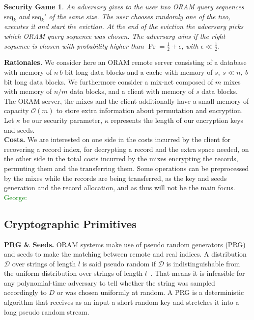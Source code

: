 \documentclass[USenglish,oneside,twocolumn]{article}
\newtheorem*{secgme}{Security Game}
\newcommand{\george}[1]{\textcolor{green}{George: #1}}
\begin{document}
%
\begin{secgme}
An adversary gives to the user two ORAM query sequences $\text{seq}_k$ and $\text{seq}_k'$ of the same size. The user chooses randomly one of the two, executes it and start the eviction. At the end of the eviction the adversary picks which ORAM query sequence was chosen. The adversary wins if the right sequence is chosen with probability higher than $\Pr = \frac{1}{2}+\epsilon$, with $\epsilon\ll\frac{1}{2}$.
\label{def:Game}
\end{secgme} 
%

\noindent\textbf{Rationales.} We consider here an ORAM remote server consisting of a database with memory of $n\ b$-bit long data blocks and a cache with memory of $s,\ s\ll n,\ b$-bit long data blocks. We furthermore consider a mix-net composed of $m$ mixes with memory of $n/m$ data blocks, and a client with memory of $s$ data blocks. The ORAM server, the mixes and the client additionally have a small memory of capacity $\mathcal{O}(m)$ to store extra information about permutation and encryption. Let $\kappa$ be our security parameter, $\kappa$ represents the length of our encryption keys and seeds.\\

\noindent\textbf{Costs.} We are interested on one side in the costs incurred by the client for recovering a record index, for decrypting a record and the extra space needed, on the other side in the total costs incurred by the mixes encrypting the records, permuting them and the transferring them.
Some operations can be preprocessed by the mixes while the records are being transferred, as the key and seeds generation and the record allocation, and as thus will not be the main focus. \george{} 
%
\subsection{Cryptographic Primitives}

\noindent\textbf{PRG \& Seeds.}
ORAM systems make use of pseudo random generators (PRG) and seeds to make the matching between remote and real indices. A distribution $\mathcal{D}$ over strings of length $l$ is said pseudo random if $\mathcal{D}$ is indistinguishable from the uniform distribution over strings of length $l$~\cite{katz2014introduction}. That means it is infeasible for any polynomial-time adversary to tell whether the string was sampled accordingly to $D$ or was chosen uniformly at random. A PRG is a deterministic algorithm that receives as an input a short random key and stretches it into a long pseudo random stream.\\\
\end{document}
